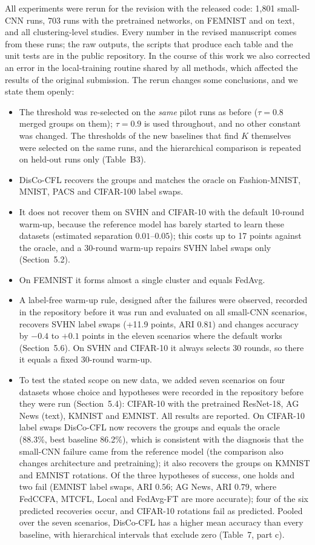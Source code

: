 \documentclass[11pt]{article}
\begin{document}
All experiments were rerun for the revision with the released code: 1{,}801 small-CNN runs, 703 runs with the pretrained networks, on FEMNIST and on text, and all clustering-level studies. Every number in the revised manuscript comes from these runs; the raw outputs, the scripts that produce each table and the unit tests are in the public repository. In the course of this work we also corrected an error in the local-training routine shared by all methods, which affected the results of the original submission. The rerun changes some conclusions, and we state them openly:
\begin{itemize}[leftmargin=*,itemsep=1pt]
\item The threshold was re-selected on the \emph{same} pilot runs as before ($\tau=0.8$ merged groups on them); $\tau=0.9$ is used throughout, and no other constant was changed. The thresholds of the new baselines that find $K$ themselves were selected on the same runs, and the hierarchical comparison is repeated on held-out runs only (Table~B3).
\item DisCo-CFL recovers the groups and matches the oracle on Fashion-MNIST, MNIST, PACS and CIFAR-100 label swaps.
\item It does not recover them on SVHN and CIFAR-10 with the default 10-round warm-up, because the reference model has barely started to learn these datasets (estimated separation $0.01$--$0.05$); this costs up to 17 points against the oracle, and a 30-round warm-up repairs SVHN label swaps only (Section~5.2).
\item On FEMNIST it forms almost a single cluster and equals FedAvg.
\item A label-free warm-up rule, designed after the failures were observed, recorded in the repository before it was run and evaluated on all small-CNN scenarios, recovers SVHN label swaps (+11.9 points, ARI $0.81$) and changes accuracy by $-0.4$ to $+0.1$ points in the eleven scenarios where the default works (Section~5.6). On SVHN and CIFAR-10 it always selects 30 rounds, so there it equals a fixed 30-round warm-up.
\item To test the stated scope on new data, we added seven scenarios on four datasets whose choice and hypotheses were recorded in the repository before they were run (Section~5.4): CIFAR-10 with the pretrained ResNet-18, AG News (text), KMNIST and EMNIST. All results are reported. On CIFAR-10 label swaps DisCo-CFL now recovers the groups and equals the oracle (88.3\%, best baseline 86.2\%), which is consistent with the diagnosis that the small-CNN failure came from the reference model (the comparison also changes architecture and pretraining); it also recovers the groups on KMNIST and EMNIST rotations. Of the three hypotheses of success, one holds and two fail (EMNIST label swaps, ARI $0.56$; AG News, ARI $0.79$, where FedCCFA, MTCFL, Local and FedAvg-FT are more accurate); four of the six predicted recoveries occur, and CIFAR-10 rotations fail as predicted. Pooled over the seven scenarios, DisCo-CFL has a higher mean accuracy than every baseline, with hierarchical intervals that exclude zero (Table~7, part c).
\end{itemize}
\end{document}
